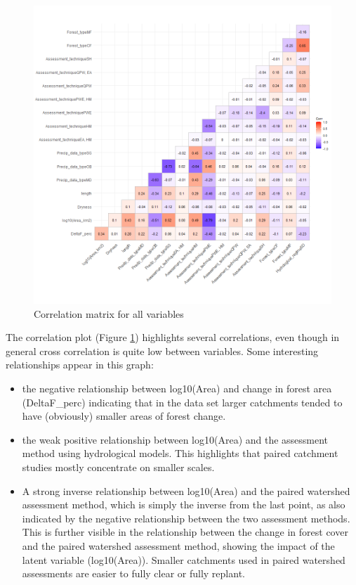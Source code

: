 \documentclass[]{elsarticle} %
\providecommand{\tightlist}{%
  \setlength{\itemsep}{0pt}\setlength{\parskip}{0pt}}
\begin{document}
\begin{figure}
\includegraphics[width=0.9\linewidth]{variable_corr_plot} \caption{Correlation matrix for all variables}\label{fig:corgraphs}
\end{figure}

The correlation plot (Figure \ref{fig:corgraphs}) highlights several correlations, even though in general cross correlation is quite low between variables. Some interesting relationships appear in this graph:

\begin{itemize}
\tightlist
\item
  the negative relationship between log10(Area) and change in forest area (DeltaF\_perc) indicating that in the data set larger catchments tended to have (obviously) smaller areas of forest change.\\
\item
  the weak positive relationship between log10(Area) and the assessment method using hydrological models. This highlights that paired catchment studies mostly concentrate on smaller scales.\\
\item
  A strong inverse relationship between log10(Area) and the paired watershed assessment method, which is simply the inverse from the last point, as also indicated by the negative relationship between the two assessment methods. This is further visible in the relationship between the change in forest cover and the paired watershed assessment method, showing the impact of the latent variable (log10(Area)). Smaller catchments used in paired watershed assessments are easier to fully clear or fully replant.
\end{itemize}
\end{document}
